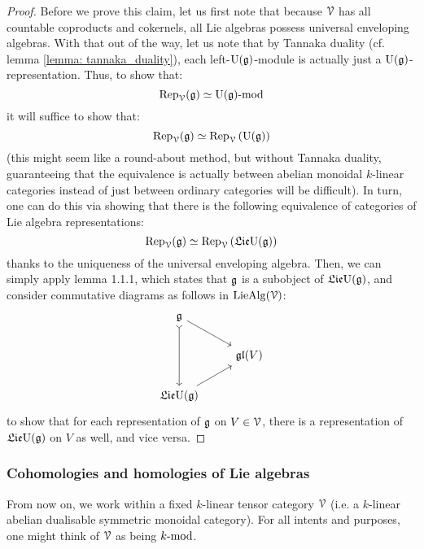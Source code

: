                 \begin{proof}
                    Before we prove this claim, let us first note that because $\calV$ has all countable coproducts and cokernels, all Lie algebras possess universal enveloping algebras. With that out of the way, let us note that by Tannaka duality (cf. lemma \ref{lemma: tannaka_duality}), each left-$\U(\g)$-module is actually just a $\U(\g)$-representation. Thus, to show that:
                        $$\Rep_{\calV}(\g) \cong {\U(\g)}\mod$$
                    it will suffice to show that:
                        $$\Rep_{\calV}(\g) \cong \Rep_{\calV}\left(\U(\g)\right)$$
                    (this might seem like a round-about method, but without Tannaka duality, guaranteeing that the equivalence is actually between abelian monoidal $k$-linear categories instead of just between ordinary categories will be difficult). In turn, one can do this via showing that there is the following equivalence of categories of Lie algebra representations:
                        $$\Rep_{\calV}(\g) \cong \Rep_{\calV}\left(\frakLie \U(\g)\right)$$
                    thanks to the uniqueness of the universal enveloping algebra. Then, we can simply apply lemma 1.1.1, which states that $\g$ is a subobject of $\frakLie \U(\g)$, and consider commutative diagrams as follows in $\Lie\Alg(\calV)$:
                        $$
                            \begin{tikzcd}
                            	{\g} \\
                            	& {\frakgl(V)} \\
                            	{\frakLie \U(\g)}
                            	\arrow[from=1-1, to=2-2]
                            	\arrow[from=3-1, to=2-2]
                            	\arrow[from=1-1, to=3-1, tail]
                            \end{tikzcd}
                        $$
                    to show that for each representation of $\g$ on $V \in \calV$, there is a representation of $\frakLie \U(\g)$ on $V$ as well, and vice versa.
                \end{proof}
                
        \subsubsection{Cohomologies and homologies of Lie algebras}
            \begin{convention}
                From now on, we work within a fixed $k$-linear tensor category $\calV$ (i.e. a $k$-linear abelian dualisable symmetric monoidal category). For all intents and purposes, one might think of $\calV$ as being $k\mod$.
            \end{convention}
            
